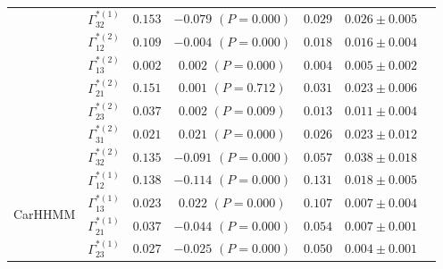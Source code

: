 \documentclass{article}
\begin{document}
\begin{center}
{\begin{tabular}{ccccccc}
                             & $\Gamma^{*(1)}_{32}$          & $0.153$                         & $-0.079$ $(P=0.000)$        & $0.029$                           & $0.026 \pm 0.005$                             \\
                             & $\Gamma^{*(2)}_{12}$          & $0.109$                         & $-0.004$ $(P=0.000)$        & $0.018$                           & $0.016 \pm 0.004$                             \\
                             & $\Gamma^{*(2)}_{13}$          & $0.002$                         & $0.002$ $(P=0.000)$        & $0.004$                           & $0.005 \pm 0.002$                             \\
                             & $\Gamma^{*(2)}_{21}$          & $0.151$                         & $0.001$ $(P=0.712)$        & $0.031$                           & $0.023 \pm 0.006$                             \\
                             & $\Gamma^{*(2)}_{23}$          & $0.037$                         & $0.002$ $(P=0.009)$        & $0.013$                           & $0.011 \pm 0.004$                             \\
                             & $\Gamma^{*(2)}_{31}$          & $0.021$                         & $0.021$ $(P=0.000)$        & $0.026$                           & $0.023 \pm 0.012$                             \\
                             & $\Gamma^{*(2)}_{32}$          & $0.135$                         & $-0.091$ $(P=0.000)$        & $0.057$                           & $0.038 \pm 0.018$                             \\ \hline
\multirow{12}{*}{CarHHMM}    & $\Gamma^{*(1)}_{12}$          & $0.138$                         & $-0.114$ $(P=0.000)$        & $0.131$                           & $0.018 \pm 0.005$                             \\
                             & $\Gamma^{*(1)}_{13}$          & $0.023$                         & $0.022$ $(P=0.000)$        & $0.107$                           & $0.007 \pm 0.004$                             \\
                             & $\Gamma^{*(1)}_{21}$          & $0.037$                         & $-0.044$ $(P=0.000)$        & $0.054$                           & $0.007 \pm 0.001$                             \\
                             & $\Gamma^{*(1)}_{23}$          & $0.027$                         & $-0.025$ $(P=0.000)$        & $0.050$                           & $0.004 \pm 0.001$                             \\

\end{tabular}}
\end{center}
\end{document}
